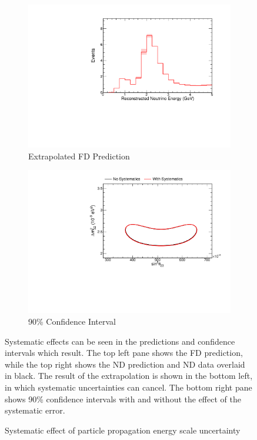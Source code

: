 {\begin{figure}
\begin{center}
\begin{subfigure}[c]{0.49\textwidth}
\includegraphics[width=\textwidth]{figures/systs/prediction/fd_extrap_prediction_geantScale.pdf}
\caption*{Extrapolated FD Prediction}
\end{subfigure}
\begin{subfigure}[c]{0.49\textwidth}
\includegraphics[width=\textwidth]{figures/systs/prediction/fd_extrap_contour_geantScale.pdf}
\caption*{90\% Confidence Interval}
\end{subfigure}
\end{center}
\caption{Systematic effect of particle propagation energy scale uncertainty}{
Systematic effects can be seen in the predictions and confidence intervals
which result.
The top left pane shows the FD prediction, while the top right shows the
ND prediction and ND data overlaid in black.
The result of the extrapolation is shown in the bottom left, in which
systematic uncertainties can cancel.
The bottom right pane shows 90\% confidence intervals with and without
the effect of the systematic error.}
\label{syst_fig_geantScale}


\end{figure}}
